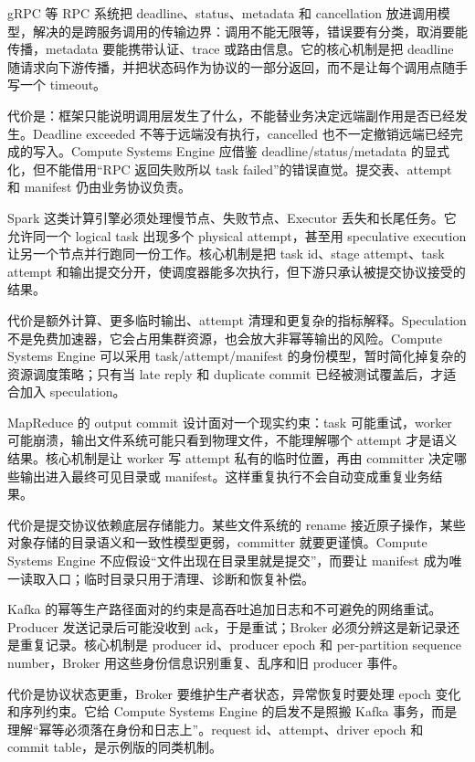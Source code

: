 \begin{casebox}
gRPC 等 RPC 系统把 deadline、status、metadata 和 cancellation 放进调用模型，解决的是跨服务调用的传输边界：调用不能无限等，错误要有分类，取消要能传播，metadata 要能携带认证、trace 或路由信息。它的核心机制是把 deadline 随请求向下游传播，并把状态码作为协议的一部分返回，而不是让每个调用点随手写一个 timeout。

代价是：框架只能说明调用层发生了什么，不能替业务决定远端副作用是否已经发生。Deadline exceeded 不等于远端没有执行，cancelled 也不一定撤销远端已经完成的写入。Compute Systems Engine 应借鉴 deadline/status/metadata 的显式化，但不能借用“RPC 返回失败所以 task failed”的错误直觉。提交表、attempt 和 manifest 仍由业务协议负责。
\end{casebox}

\begin{casebox}
Spark 这类计算引擎必须处理慢节点、失败节点、Executor 丢失和长尾任务。它允许同一个 logical task 出现多个 physical attempt，甚至用 speculative execution 让另一个节点并行跑同一份工作。核心机制是把 task id、stage attempt、task attempt 和输出提交分开，使调度器能多次执行，但下游只承认被提交协议接受的结果。

代价是额外计算、更多临时输出、attempt 清理和更复杂的指标解释。Speculation 不是免费加速器，它会占用集群资源，也会放大非幂等输出的风险。Compute Systems Engine 可以采用 task/attempt/manifest 的身份模型，暂时简化掉复杂的资源调度策略；只有当 late reply 和 duplicate commit 已经被测试覆盖后，才适合加入 speculation。
\end{casebox}

\begin{casebox}
MapReduce 的 output commit 设计面对一个现实约束：task 可能重试，worker 可能崩溃，输出文件系统可能只看到物理文件，不能理解哪个 attempt 才是语义结果。核心机制是让 worker 写 attempt 私有的临时位置，再由 committer 决定哪些输出进入最终可见目录或 manifest。这样重复执行不会自动变成重复业务结果。

代价是提交协议依赖底层存储能力。某些文件系统的 rename 接近原子操作，某些对象存储的目录语义和一致性模型更弱，committer 就要更谨慎。Compute Systems Engine 不应假设“文件出现在目录里就是提交”，而要让 manifest 成为唯一读取入口；临时目录只用于清理、诊断和恢复补偿。
\end{casebox}

\begin{casebox}
Kafka 的幂等生产路径面对的约束是高吞吐追加日志和不可避免的网络重试。Producer 发送记录后可能没收到 ack，于是重试；Broker 必须分辨这是新记录还是重复记录。核心机制是 producer id、producer epoch 和 per-partition sequence number，Broker 用这些身份信息识别重复、乱序和旧 producer 事件。

代价是协议状态更重，Broker 要维护生产者状态，异常恢复时要处理 epoch 变化和序列约束。它给 Compute Systems Engine 的启发不是照搬 Kafka 事务，而是理解“幂等必须落在身份和日志上”。request id、attempt、driver epoch 和 commit table，是示例版的同类机制。
\end{casebox}

